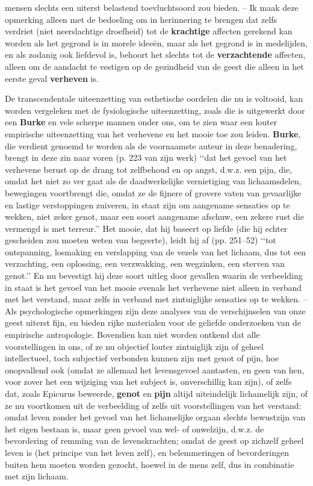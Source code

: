 mensen slechts een uiterst belastend toevluchtsoord zou bieden. – Ik maak deze opmerking alleen met de bedoeling om in herinnering te brengen dat zelfs verdriet (niet neerslachtige droefheid) tot de \textbf{krachtige} affecten gerekend kan worden als het gegrond is in morele ideeën, maar als het gegrond is in medelijden, en als zodanig ook liefdevol is, behoort het slechts tot de \textbf{verzachtende} affecten, alleen om de aandacht te vestigen op de gezindheid van de geest die alleen in het eerste geval \textbf{verheven} is.

\bigskip
De transcendentale uiteenzetting van esthetische oordelen die nu is voltooid, kan worden vergeleken met de fysiologische uiteenzetting, zoals die is uitgewerkt door een \textbf{Burke} en vele scherpe mannen onder ons, om te zien waar een louter empirische uiteenzetting van het verhevene en het mooie toe zou leiden. \textbf{Burke}, die verdient genoemd te worden als de voornaamste auteur in deze benadering, brengt in deze zin naar voren (p. 223 van zijn werk) ‘‘dat het gevoel van het verhevene berust op de drang tot zelfbehoud en op angst, d.w.z. een pijn, die, omdat het niet zo ver gaat als de daadwerkelijke vernietiging van lichaamsdelen, bewegingen voortbrengt die, omdat ze de fijnere of grovere vaten van gevaarlijke en lastige verstoppingen zuiveren, in staat zijn om aangename sensaties op te wekken, niet zeker genot, maar een soort aangename afschuw, een zekere rust die vermengd is met terreur.’’ Het mooie, dat hij baseert op liefde (die hij echter gescheiden zou moeten weten van begeerte), leidt hij af (pp. 251–52) ‘‘tot ontspanning, losmaking en verslapping van de vezels van het lichaam, dus tot een verzachting, een oplossing, een verzwakking, een wegzinken, een sterven van genot.’’ En nu bevestigt hij deze soort uitleg door gevallen waarin de verbeelding in staat is het gevoel van het mooie evenals het verhevene niet alleen in verband met het verstand, maar zelfs in verband met zintuiglijke sensaties op te wekken. – Als psychologische opmerkingen zijn deze analyses van de verschijnselen van onze geest uiterst fijn, en bieden rijke materialen voor de geliefde onderzoeken van de empirische antropologie. Bovendien kan niet worden ontkend dat alle voorstellingen in ons, of ze nu objectief louter zintuiglijk zijn of geheel intellectueel, toch subjectief verbonden kunnen zijn met genot of pijn, hoe onopvallend ook (omdat ze allemaal het levensgevoel aantasten, en geen van hen, voor zover het een wijziging van het subject is, onverschillig kan zijn), of zelfs dat, zoals Epicurus beweerde, \textbf{genot} en \textbf{pijn} altijd uiteindelijk lichamelijk zijn, of ze nu voortkomen uit de verbeelding of zelfs uit voorstellingen van het verstand: omdat leven zonder het gevoel van het lichamelijke orgaan slechts bewustzijn van het eigen bestaan is, maar geen gevoel van wel- of onwelzijn, d.w.z. de bevordering of remming van de levenskrachten; omdat de geest op zichzelf geheel leven is (het principe van het leven zelf), en belemmeringen of bevorderingen buiten hem moeten worden gezocht, hoewel in de mens zelf, dus in combinatie met zijn lichaam.

